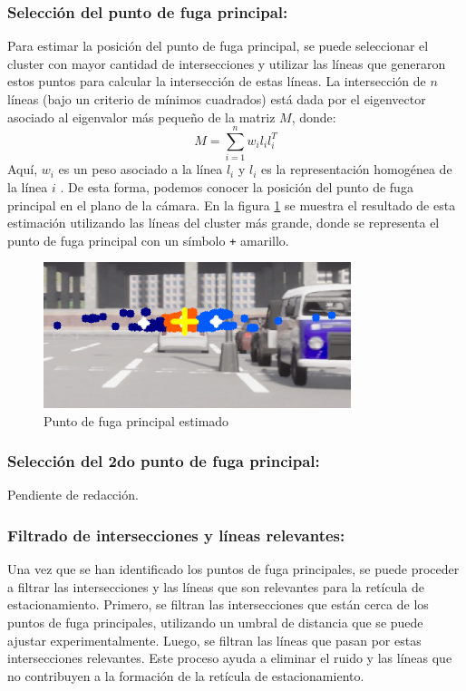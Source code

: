 \subsubsection{Selección del punto de fuga principal:}
\noindent
Para estimar la posición del punto de fuga principal, se puede seleccionar el cluster con mayor cantidad de intersecciones y
utilizar las líneas que generaron estos puntos para calcular la intersección de estas líneas.
La intersección de $n$ líneas (bajo un criterio de mínimos cuadrados) está dada por
el eigenvector asociado al eigenvalor más pequeño de la matriz $M$, donde:
\[
    M = \sum_{i=1}^{n} w_i l_i l_i^T
\]
Aquí, $w_i$ es un peso asociado a la línea $l_i$ y $l_i$ es la representación homogénea de la línea $i$ \cite{kanatani1998statistical}.
De esta forma, podemos conocer la posición del punto de fuga principal en el plano de la cámara.
En la figura \ref{fig:vanishingPoint} se muestra el resultado de esta estimación utilizando las líneas del cluster más grande, donde se
representa el punto de fuga principal con un símbolo \texttt{+} amarillo.
\begin{figure}[!ht]
    \centering
    \includegraphics[width=0.8\textwidth]{img/reticule/vanishingPoint}
    \caption{Punto de fuga principal estimado}
    \label{fig:vanishingPoint}
\end{figure}

\subsubsection{Selección del 2do punto de fuga principal:}
Pendiente de redacción.

\subsubsection{Filtrado de intersecciones y líneas relevantes:}
\noindent
Una vez que se han identificado los puntos de fuga principales, se puede proceder a filtrar las intersecciones y las líneas que son
relevantes para la retícula de estacionamiento.
Primero, se filtran las intersecciones que están cerca de los puntos de fuga principales, utilizando un umbral de distancia que se puede ajustar experimentalmente.
Luego, se filtran las líneas que pasan por estas intersecciones relevantes.
Este proceso ayuda a eliminar el ruido y las líneas que no contribuyen a la formación de la retícula de estacionamiento.


